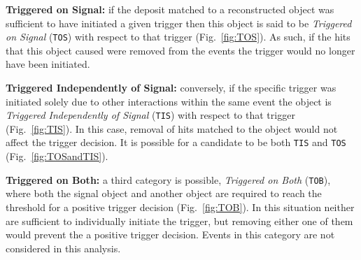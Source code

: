 \begin{description}
\item \textbf{Triggered on Signal:} if the deposit matched to a reconstructed object was sufficient to have initiated a given trigger then this object is said to be \emph{Triggered on Signal} (\texttt{TOS}) with respect to that trigger (Fig.~\ref{fig:TOS}). As such, if the hits that this object caused were removed from the events the trigger would no longer have been initiated.
\item \textbf{Triggered Independently of Signal:} conversely, if the specific trigger was initiated solely due to other interactions within the same event the object is \emph{Triggered Independently of Signal} (\texttt{TIS}) with respect to that trigger (Fig.~\ref{fig:TIS}). In this case, removal of hits matched to the object would not affect the trigger decision.  It is possible for a candidate to be both \texttt{TIS} and \texttt{TOS} (Fig.~\ref{fig:TOSandTIS}).
\item \textbf{Triggered on Both:} a third category is possible, \emph{Triggered on Both} (\texttt{TOB}), where both the signal object and another object are required to reach the threshold for a positive trigger decision (Fig.~\ref{fig:TOB}). In this situation neither are sufficient to individually initiate the trigger, but removing either one of them would prevent the a positive trigger decision. Events in this category are not considered in this analysis.
\end{description}

